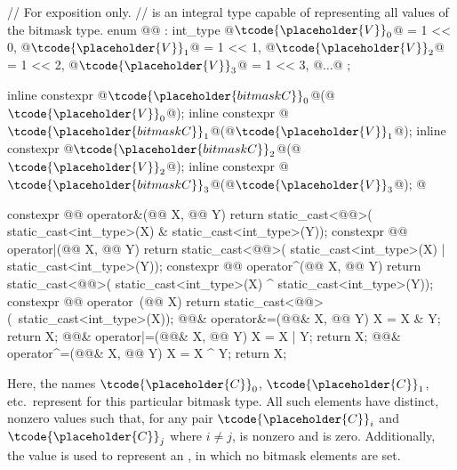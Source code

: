 \begin{codeblock}
// For exposition only.
//  is an integral type capable of representing all values of the bitmask type.
enum @@ : int_type {
  @$\tcode{\placeholder{V}}_{0}$@ = 1 << 0, @$\tcode{\placeholder{V}}_{1}$@ = 1 << 1, @$\tcode{\placeholder{V}}_{2}$@ = 1 << 2, @$\tcode{\placeholder{V}}_{3}$@ = 1 << 3, @$\ldots$@
};

inline constexpr @$\tcode{\placeholder{bitmask C}}_{0}$@(@$\tcode{\placeholder{V}}_{0}{}$@);
inline constexpr @$\tcode{\placeholder{bitmask C}}_{1}$@(@$\tcode{\placeholder{V}}_{1}{}$@);
inline constexpr @$\tcode{\placeholder{bitmask C}}_{2}$@(@$\tcode{\placeholder{V}}_{2}{}$@);
inline constexpr @$\tcode{\placeholder{bitmask C}}_{3}$@(@$\tcode{\placeholder{V}}_{3}{}$@);
  @\vdots@

constexpr @@ operator&(@@ X, @@ Y) {
  return static_cast<@@>(
    static_cast<int_type>(X) & static_cast<int_type>(Y));
}
constexpr @@ operator|(@@ X, @@ Y) {
  return static_cast<@@>(
    static_cast<int_type>(X) | static_cast<int_type>(Y));
}
constexpr @@ operator^(@@ X, @@ Y) {
  return static_cast<@@>(
    static_cast<int_type>(X) ^ static_cast<int_type>(Y));
}
constexpr @@ operator~(@@ X) {
  return static_cast<@@>(~static_cast<int_type>(X));
}
@@& operator&=(@@& X, @@ Y) {
  X = X & Y; return X;
}
@@& operator|=(@@& X, @@ Y) {
  X = X | Y; return X;
}
@@& operator^=(@@& X, @@ Y) {
  X = X ^ Y; return X;
}
\end{codeblock}

\pnum
Here, the names $\tcode{\placeholder{C}}_0$,
$\tcode{\placeholder{C}}_1$, etc.\ represent
for this particular bitmask type.
%
All such elements have distinct, nonzero values such that, for any pair $\tcode{\placeholder{C}}_i$
and $\tcode{\placeholder{C}}_j$ where $i \neq j$,  is nonzero and
 is zero.
Additionally, the value  is used to represent an , in which no
bitmask elements are set.

